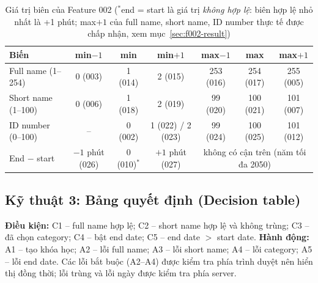 \begin{table}[H]
\centering\footnotesize
\begin{tabular}{|l|c|c|c|c|c|c|}
\hline
\rowcolor{gray!15}\textbf{Biến} & \textbf{min$-1$} & \textbf{min} & \textbf{min$+1$} & \textbf{max$-1$} & \textbf{max} & \textbf{max$+1$} \\ \hline
Full name (1--254) & 0 (003) & 1 (014) & 2 (015) & 253 (016) & 254 (017) & 255 (005) \\ \hline
Short name (1--100) & 0 (006) & 1 (018) & 2 (019) & 99 (020) & 100 (021) & 101 (007) \\ \hline
ID number (0--100) & -- & 0 (002) & 1 (022) \;/ 2 (023) & 99 (024) & 100 (025) & 101 (012) \\ \hline
End $-$ start & $-1$ phút (026) & 0 (010)$^{*}$ & $+1$ phút (027) & \multicolumn{3}{c|}{không có cận trên (năm tối đa 2050)} \\ \hline
\end{tabular}
\caption{Giá trị biên của Feature 002 ($^{*}$end = start là giá trị \emph{không hợp lệ}: biên hợp lệ nhỏ nhất là +1 phút;
max$+1$ của full name, short name, ID number thực tế được chấp nhận, xem mục~\ref{sec:f002-result})}
\end{table}

\subsection{Kỹ thuật 3: Bảng quyết định (Decision table)}
\textbf{Điều kiện:} C1 -- full name hợp lệ; C2 -- short name hợp lệ và không trùng; C3 -- đã chọn category;
C4 -- bật end date; C5 -- end date $>$ start date.
\textbf{Hành động:} A1 -- tạo khóa học; A2 -- lỗi full name; A3 -- lỗi short name; A4 -- lỗi category; A5 -- lỗi end date.
Các lỗi bắt buộc (A2--A4) được kiểm tra phía trình duyệt nên hiển thị đồng thời; lỗi trùng và lỗi ngày được kiểm tra phía server.

